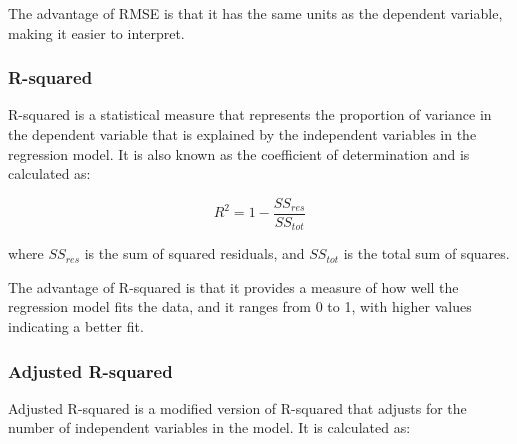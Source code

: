 \documentclass{article}
\begin{document}
The advantage of RMSE is that it has the same units as the dependent variable, making it easier to interpret.

\subsubsection{R-squared}
\begin{center}
    \end{center}
    
R-squared is a statistical measure that represents the proportion of variance in the dependent variable that is explained by the independent variables in the regression model. It is also known as the coefficient of determination and is calculated as:

\begin{equation}
R^2 = 1 - \frac{SS_{res}}{SS_{tot}}
\end{equation}

where $SS_{res}$ is the sum of squared residuals, and $SS_{tot}$ is the total sum of squares.

The advantage of R-squared is that it provides a measure of how well the regression model fits the data, and it ranges from 0 to 1, with higher values indicating a better fit.

\subsubsection{Adjusted R-squared}
\begin{center}
    \end{center}
Adjusted R-squared is a modified version of R-squared that adjusts for the number of independent variables in the model. It is calculated as:
\end{document}
